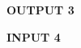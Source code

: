 \textbf{OUTPUT 3} 

\begin{figure}[h]
  \flushleft
\end{figure}

\pagebreak
\textbf{INPUT 4}

\begin{figure}[h]
  \centering
\end{figure}

